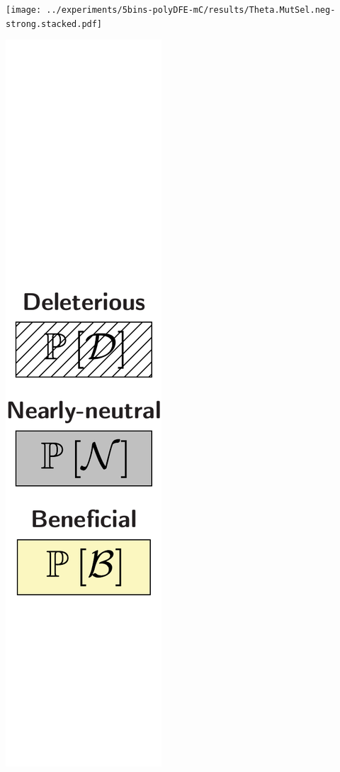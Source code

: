 \documentclass{article}
\begin{document}
\begin{center}
\begin{minipage}{0.09\linewidth}
        \end{minipage}
        \begin{minipage}{0.9\linewidth}
            \texttt{[image: ../experiments/5bins-polyDFE-mC/results/Theta.MutSel.neg-strong.stacked.pdf]} \\
        \end{minipage}
        \begin{minipage}{0.09\linewidth}
            \includegraphics[width=\linewidth, page=1]{artworks/legend.polycat}

\end{minipage}
\end{center}
\end{document}
